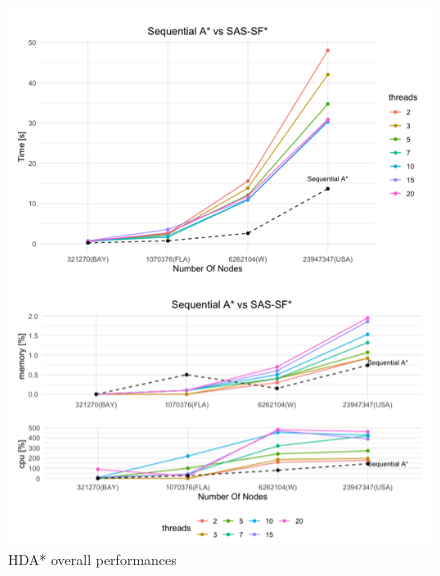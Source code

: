 \documentclass[twocolumn, switch]{article} %
\begin{document}
\begin{figure}[ht!]
  \centering
  \includegraphics[width=1\linewidth]{hda/tot.png}
  \caption{HDA* overall performances}
  \label{hdatot}
\end{figure}
\end{document}
